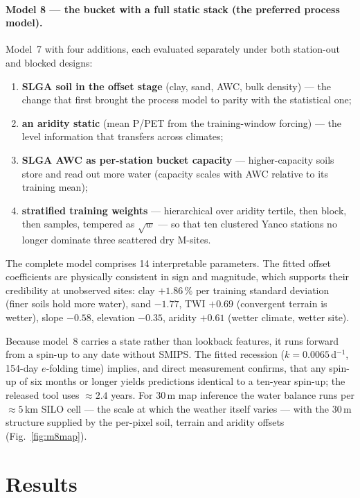 \documentclass[11pt,a4paper]{article}
\begin{document}
\paragraph{Model 8 --- the bucket with a full static stack (the preferred
process model).} Model~7 with four additions, each evaluated separately under
both station-out and blocked designs:
\begin{enumerate}
\item \textbf{SLGA soil in the offset stage} (clay, sand, AWC, bulk density)
  --- the change that first brought the process model to parity with the
  statistical one;
\item \textbf{an aridity static} (mean P/PET from the training-window
  forcing) --- the level information that transfers across climates;
\item \textbf{SLGA AWC as per-station bucket capacity} --- higher-capacity
  soils store and read out more water (capacity scales with AWC relative to
  its training mean);
\item \textbf{stratified training weights} --- hierarchical over aridity
  tertile, then block, then samples, tempered as $\sqrt{w}$ --- so that ten
  clustered Yanco stations no longer dominate three scattered dry M-sites.
\end{enumerate}

The complete model comprises 14 interpretable parameters. The fitted offset
coefficients are physically consistent in sign and magnitude, which supports
their credibility at unobserved sites: clay $+1.86$\,\% per training standard
deviation (finer soils hold more water), sand $-1.77$, TWI $+0.69$ (convergent
terrain is wetter), slope $-0.58$, elevation $-0.35$, aridity $+0.61$ (wetter
climate, wetter site).

Because model~8 carries a state rather than lookback features, it runs forward
from a spin-up to any date without SMIPS. The fitted recession
($k = 0.0065$\,d$^{-1}$, 154-day $e$-folding time) implies, and direct
measurement confirms, that any spin-up of six months or longer yields
predictions identical to a ten-year spin-up; the released tool uses
${\approx}2.4$ years. For 30\,m map inference the water balance runs per
${\approx}5$\,km SILO cell --- the scale at which the weather itself varies
--- with the 30\,m structure supplied by the per-pixel soil, terrain and
aridity offsets (Fig.~\ref{fig:m8map}).

\section{Results}\label{sec:results}
\end{document}
